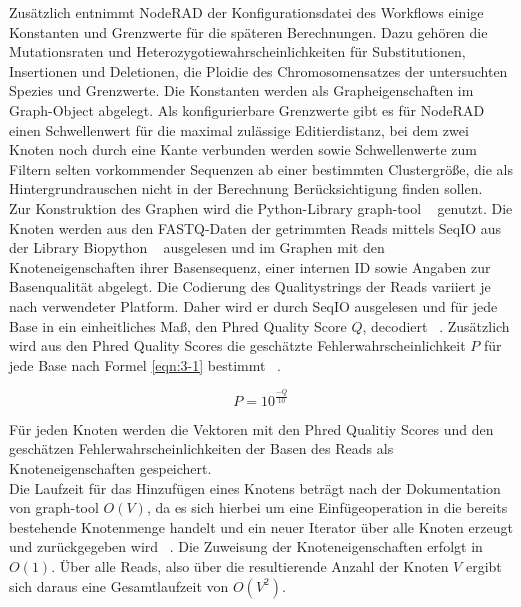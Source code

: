Zusätzlich entnimmt NodeRAD der Konfigurationsdatei des Workflows einige Konstanten und Grenzwerte für die späteren Berechnungen. Dazu gehören die Mutationsraten und Heterozygotiewahrscheinlichkeiten für Substitutionen, Insertionen und Deletionen, die Ploidie des Chromosomensatzes der untersuchten Spezies und Grenzwerte. Die Konstanten werden als Grapheigenschaften im Graph-Object abgelegt. Als konfigurierbare Grenzwerte gibt es für NodeRAD einen Schwellenwert für die maximal zulässige Editierdistanz, bei dem zwei Knoten noch durch eine Kante verbunden werden sowie Schwellenwerte zum Filtern selten vorkommender Sequenzen ab einer bestimmten Clustergröße, die als Hintergrundrauschen nicht in der Berechnung Berücksichtigung finden sollen. \\

Zur Konstruktion des Graphen wird die Python-Library graph-tool ~\cite{peixoto_2014} genutzt. Die Knoten werden aus den FASTQ-Daten der getrimmten Reads mittels SeqIO aus der Library Biopython ~\cite{cock_2009_1} ausgelesen und im Graphen mit den Knoteneigenschaften ihrer Basensequenz, einer internen ID sowie Angaben zur Basenqualität abgelegt. Die Codierung des Qualitystrings der Reads variiert je nach verwendeter Platform. Daher wird er durch SeqIO ausgelesen und für jede Base in ein einheitliches Maß, den Phred Quality Score $ Q $, decodiert ~\cite{cock_2009_2}. Zusätzlich wird aus den Phred Quality Scores die geschätzte Fehlerwahrscheinlichkeit $ P $ für jede Base nach Formel \eqref{eqn:3-1} bestimmt ~\cite{ewing_1998}.  

\begin{equation} \label{eqn:3-1}
    \tag{3-1}
    P = 10^{\frac{-Q}{10}}
\end{equation}

Für jeden Knoten werden die Vektoren mit den Phred Qualitiy Scores und den geschätzen Fehlerwahrscheinlichkeiten der Basen des Reads als Knoteneigenschaften gespeichert. \\

Die Laufzeit für das Hinzufügen eines Knotens beträgt nach der Dokumentation von graph-tool  $ O(V) $, da es sich hierbei um eine Einfügeoperation in die bereits bestehende Knotenmenge handelt und ein neuer Iterator über alle Knoten erzeugt und zurückgegeben wird ~\cite{docs_graph_tool}. Die Zuweisung der Knoteneigenschaften erfolgt in $ O(1) $. Über alle Reads, also über die resultierende Anzahl der Knoten $ V $ ergibt sich daraus eine Gesamtlaufzeit von $ O(V^2) $.\\

